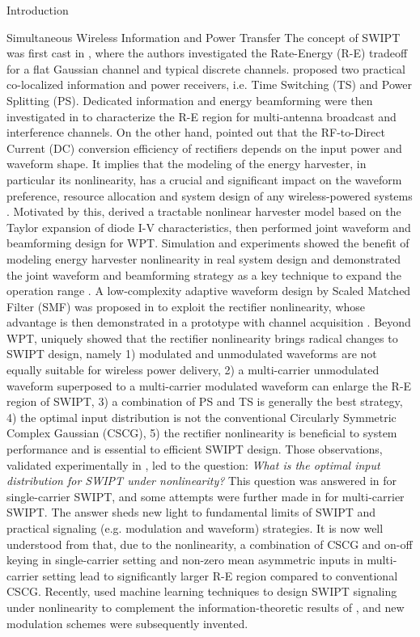 \documentclass[journal]{IEEEtran}
\begin{document}
\begin{section}{Introduction}
\begin{subsection}{Simultaneous Wireless Information and Power Transfer}
			The concept of SWIPT was first cast in \cite{Varshney2008}, where the authors investigated the Rate-Energy (R-E) tradeoff for a flat Gaussian channel and typical discrete channels. \cite{Zhou2013} proposed two practical co-localized information and power receivers, i.e. Time Switching (TS) and Power Splitting (PS). Dedicated information and energy beamforming were then investigated in \cite{Zhang2013,Park2013} to characterize the R-E region for multi-antenna broadcast and interference channels. On the other hand, \cite{Trotter2009} pointed out that the RF-to-Direct Current (DC) conversion efficiency of rectifiers depends on the input power and waveform shape. It implies that the modeling of the energy harvester, in particular its nonlinearity, has a crucial and significant impact on the waveform preference, resource allocation and system design of any wireless-powered systems \cite{Trotter2009,Clerckx2018,Clerckx2019}. Motivated by this, \cite{Clerckx2016a} derived a tractable nonlinear harvester model based on the Taylor expansion of diode I-V characteristics, then performed joint waveform and beamforming design for WPT. Simulation and experiments showed the benefit of modeling energy harvester nonlinearity in real system design \cite{Kim2019,Kim2020a} and demonstrated the joint waveform and beamforming strategy as a key technique to expand the operation range \cite{Kim2020}. A low-complexity adaptive waveform design by Scaled Matched Filter (SMF) was proposed in \cite{Clerckx2017} to exploit the rectifier nonlinearity, whose advantage is then demonstrated in a prototype with channel acquisition \cite{Kim2017}. Beyond WPT, \cite{Clerckx2018b} uniquely showed that the rectifier nonlinearity brings radical changes to SWIPT design, namely 1) modulated and unmodulated waveforms are not equally suitable for wireless power delivery, 2) a multi-carrier unmodulated waveform superposed to a multi-carrier modulated waveform can enlarge the R-E region of SWIPT, 3) a combination of PS and TS is generally the best strategy, 4) the optimal input distribution is not the conventional Circularly Symmetric Complex Gaussian (CSCG), 5) the rectifier nonlinearity is beneficial to system performance and is essential to efficient SWIPT design. Those observations, validated experimentally in \cite{Kim2019}, led to the question: \emph{What is the optimal input distribution for SWIPT under nonlinearity?} This question was answered in \cite{Varasteh2020} for single-carrier SWIPT, and some attempts were further made in \cite{Varasteh2019d} for multi-carrier SWIPT. The answer sheds new light to fundamental limits of SWIPT and practical signaling (e.g. modulation and waveform) strategies. It is now well understood from \cite{Clerckx2018b,Varasteh2020,Varasteh2019d} that, due to the nonlinearity, a combination of CSCG and on-off keying in single-carrier setting and non-zero mean asymmetric inputs in multi-carrier setting lead to significantly larger R-E region compared to conventional CSCG. Recently, \cite{Varasteh2020a} used machine learning techniques to design SWIPT signaling under nonlinearity to complement the information-theoretic results of \cite{Varasteh2020}, and new modulation schemes were subsequently invented.

\end{subsection}
\end{section}
\end{document}
